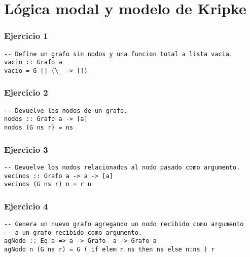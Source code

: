 \section*{L\'ogica modal y modelo de Kripke}


\subsubsection*{Ejercicio 1}
\begin{lstlisting}
-- Define un grafo sin nodos y una funcion total a lista vacia.
vacio :: Grafo a
vacio = G [] (\_ -> [])

\end{lstlisting}
\vspace{1cm}

\subsubsection*{Ejercicio 2}
\begin{lstlisting}
-- Devuelve los nodos de un grafo.
nodos :: Grafo a -> [a]
nodos (G ns r) = ns
\end{lstlisting}
\vspace{1cm}

\subsubsection*{Ejercicio 3}
\begin{lstlisting}
-- Devuelve los nodos relacionados al nodo pasado como argumento.
vecinos :: Grafo a -> a -> [a]
vecinos (G ns r) n = r n
\end{lstlisting}
\vspace{1cm}

\subsubsection*{Ejercicio 4}
\begin{lstlisting}
-- Genera un nuevo grafo agregando un nodo recibido como argumento
-- a un grafo recibido como argumento.
agNodo :: Eq a => a -> Grafo  a -> Grafo a
agNodo n (G ns r) = G ( if elem n ns then ns else n:ns ) r
\end{lstlisting}
\vspace{1cm}

